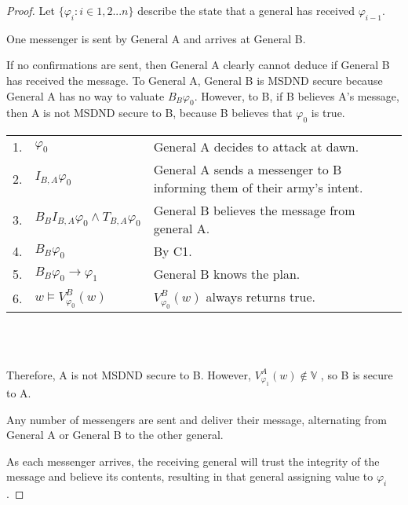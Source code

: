 \begin{proof}
Let $\{ \varphi_i : i \in 1,2 ... n \}$ describe the state that a general has received $\varphi_{i-1}$.

\begin{case}
One messenger is sent by General A and arrives at General B.
\label{case:generalsn0}
\end{case}

If no confirmations are sent, then General A clearly cannot deduce if General B has received the message.
To General A, General B is MSDND secure because General A has no way to valuate $B_B \varphi_0$.
However, to B, if B believes A's message, then A is not MSDND secure to B, because B believes that $\varphi_0$ is true.

\begin{table}[H]
\centering
\small
\begin{tabularx}{\linewidth}{l l X}
1. & $\varphi_0$ & General A decides to attack at dawn. \\
2. & $I_{B,A} \varphi_0$ & General A sends a messenger to B informing them of their army's intent. \\
3. & $B_{B}I_{B,A} \varphi_0 \wedge T_{B,A} \varphi_0$ & General B believes the message from general A. \\
4. & $B_{B} \varphi_0$ & By C1. \\
5. & $B_{B} \varphi_0 \rightarrow \varphi_1$ & General B knows the plan. \\
6. & $w \vDash V_{\varphi_0}^{B}(w)$ & $V_{\varphi_0}^{B}(w)$ always returns true. \\
\end{tabularx} \\~\\
\label{tab:twoarmiesproof}
\end{table}

Therefore, A is not MSDND secure to B. However, $V_{\varphi_1}^{A}(w) \not \in \mathbb{V}$ , so B is secure to A.

\begin{case}
Any number of messengers are sent and deliver their message, alternating from General A or General B to the other general. \label{case:generalsnn}
\end{case}

As each messenger arrives, the receiving general will trust the integrity of the message and believe its contents, resulting in that general assigning value to $\varphi_i$.


\end{proof}
